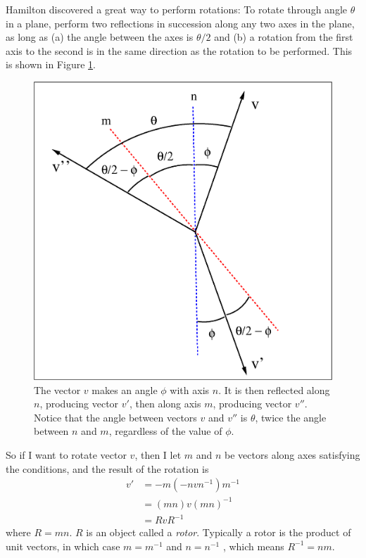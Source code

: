 \documentclass{utarticle}
\begin{document}
Hamilton discovered a great way to perform rotations:  To rotate through 
angle $\theta$ in a plane, perform two reflections in succession 
along any two axes in the plane, as long as (a) the angle between 
the axes is $\theta/2$ and (b) a rotation from the first axis to the second is 
in the same direction as the rotation to be performed.  This is shown in 
Figure \ref{rotfromref}.  
\begin{figure}
\begin{center}
\includegraphics[height=0.4\textheight]{rotate.eps}
\end{center}
\caption{The vector $v$ makes an angle $\phi$ with axis $n$.  It is then 
         reflected along $n$, producing vector $v'$, then along axis $m$, 
         producing vector $v''$.  Notice that the angle between vectors 
         $v$ and $v''$ is $\theta$, twice the angle between $n$ and $m$,
         regardless of the value of $\phi$.}
\label{rotfromref}
\end{figure}
So if I want to rotate vector $v$, then I let $m$ and $n$ be vectors along axes
satisfying the conditions, and the result of the rotation is
\begin{align} 
v' & = -m (-n v n^{-1}) m^{-1} \nonumber \\
   & = (m n) v (m n)^{-1} \nonumber \\
   & = R v R^{-1}
\label{rotdef} 
\end{align}
where $R = mn$.  $R$ is an object called a \emph{rotor}.  
Typically a rotor is the product of unit vectors, in which case $m = m^{-1}$ 
and $n= n^{-1}$ , which means $R^{-1}=nm$.  
\end{document}
